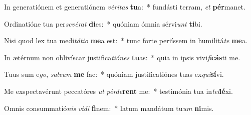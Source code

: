 \item In generatiónem et generatiónem \textit{vé}\textit{ri}\textit{tas} \textbf{tu}a:~* fundásti terram, \textit{et} \textbf{pér}manet.
\item Ordinatióne tua per\textit{se}\textit{vé}\textit{rat} \textbf{di}es:~* quóniam ómnia sérvi\textit{unt} \textbf{ti}bi.
\item Nisi quod lex tua medi\textit{tá}\textit{ti}\textit{o} \textbf{me}a est:~* tunc forte periíssem in humilitá\textit{te} \textbf{me}a.
\item In ætérnum non oblivíscar justifica\textit{ti}\textit{ó}\textit{nes} \textbf{tu}as:~* quia in ipsis vivi\textit{fi}\textbf{cás}ti me.
\item Tuus sum e\textit{go}, \textit{sal}\textit{vum} \textbf{me} fac:~* quóniam justificatiónes tuas ex\textit{qui}\textbf{sí}vi.
\item Me exspectavérunt peccatóres \textit{ut} \textit{pér}\textit{de}\textbf{rent} me:~* testimónia tua in\textit{tel}\textbf{lé}xi.
\item Omnis consummatió\textit{nis} \textit{vi}\textit{di} \textbf{fi}nem:~* latum mandátum tu\textit{um} \textbf{ni}mis.
